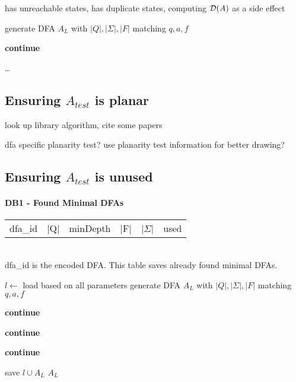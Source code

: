 has unreachable states, has duplicate states, computing $\mathcal{D}(A)$ as a side effect

\vspace{0.2cm}
\begin{algorithmic}[1]
			\State generate DFA $A_L$ with $|Q|, |\Sigma|, |F|$ matching $q, a, f$
			
				\State \textbf{continue}
			\EndIf
			
			\ldots
		\EndWhile
	\EndFunction
\end{algorithmic}
\vspace{0.2cm}

\subsection{Ensuring $A_{test}$ is planar}

look up library algorithm, cite some papers

dfa specific planarity test?
use planarity test information for better drawing?

\subsection{Ensuring $A_{test}$ is unused}

\paragraph*{DB1 - Found Minimal DFAs}

\begin{tabular}{c c c c c c}
	dfa\_id & |Q| & minDepth & |F| & |$\Sigma$| & used
\end{tabular}\\
dfa\_id is the encoded DFA. This table saves already found minimal DFAs.

\vspace{0.2cm}
\begin{algorithmic}[1]
		\State $l \gets$ load based on all parameters
			\State generate DFA $A_L$ with $|Q|, |\Sigma|, |F|$ matching $q, a, f$
			
				\State \textbf{continue}
			\EndIf
			
				\State \textbf{continue}
			\EndIf
			
				\State \textbf{continue}
			\EndIf
			
			\State save $l \cup A_L$
			\State\Return $A_L$
		\EndWhile
	\EndFunction
\end{algorithmic}
\vspace{0.2cm}


